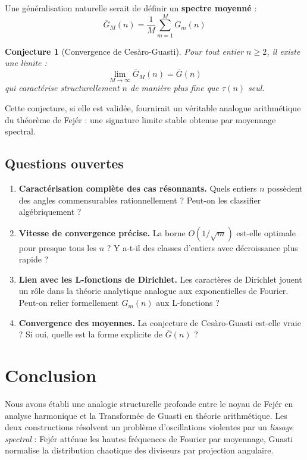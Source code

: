 \documentclass[12pt,a4paper]{article}
\newtheorem{conjecture}[theorem]{Conjecture}
\theoremstyle{definition}
\theoremstyle{remark}
\newcommand{\Gm}[2]{G_{#1}(#2)}              %
\begin{document}
Une généralisation naturelle serait de définir un \textbf{spectre moyenné} :
\[
\overline{G}_M(n) = \frac{1}{M} \sum_{m=1}^{M} \Gm{m}{n}
\]

\begin{conjecture}[Convergence de Cesàro-Guasti]
Pour tout entier $n \geq 2$, il existe une limite :
\[
\lim_{M \to \infty} \overline{G}_M(n) = \overline{G}(n)
\]
qui caractérise structurellement $n$ de manière plus fine que $\tau(n)$ seul.
\end{conjecture}

Cette conjecture, si elle est validée, fournirait un véritable analogue arithmétique du théorème de Fejér : une signature limite stable obtenue par moyennage spectral.

\subsection{Questions ouvertes}

\begin{enumerate}
\item \textbf{Caractérisation complète des cas résonnants.} Quels entiers $n$ possèdent des angles commensurables rationnellement ? Peut-on les classifier algébriquement ?

\item \textbf{Vitesse de convergence précise.} La borne $O(1/\sqrt{m})$ est-elle optimale pour presque tous les $n$ ? Y a-t-il des classes d'entiers avec décroissance plus rapide ?

\item \textbf{Lien avec les L-fonctions de Dirichlet.} Les caractères de Dirichlet jouent un rôle dans la théorie analytique analogue aux exponentielles de Fourier. Peut-on relier formellement $\Gm{m}{n}$ aux L-fonctions ?

\item \textbf{Convergence des moyennes.} La conjecture de Cesàro-Guasti est-elle vraie ? Si oui, quelle est la forme explicite de $\overline{G}(n)$ ?
\end{enumerate}

\section{Conclusion}

Nous avons établi une analogie structurelle profonde entre le noyau de Fejér en analyse harmonique et la Transformée de Guasti en théorie arithmétique. Les deux constructions résolvent un problème d'oscillations violentes par un \emph{lissage spectral} : Fejér atténue les hautes fréquences de Fourier par moyennage, Guasti normalise la distribution chaotique des diviseurs par projection angulaire.
\end{document}
